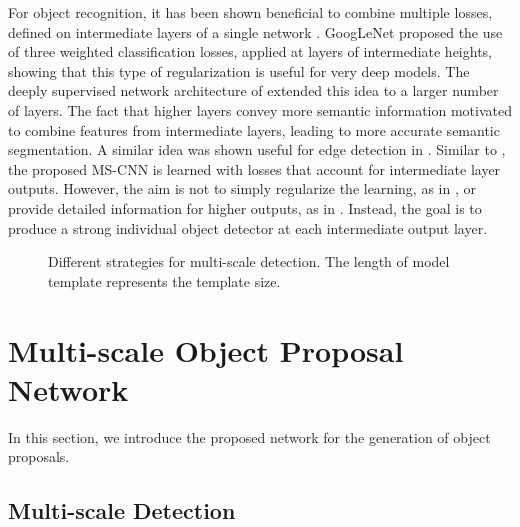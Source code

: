 \documentclass[runningheads]{llncs}
\begin{document}
For object recognition, it has been shown beneficial to
combine multiple losses, defined on intermediate layers of a single
network \cite{DBLP:conf/cvpr/SzegedyLJSRAEVR15,DBLP:conf/aistats/LeeXGZT15,DBLP:conf/cvpr/LongSD15,DBLP:conf/iccv/XieT15}.
GoogLeNet \cite{DBLP:conf/cvpr/SzegedyLJSRAEVR15} proposed the use of three
weighted classification losses, applied at layers of intermediate heights,
showing that this type of regularization is useful for very deep models.
The deeply supervised network architecture of
\cite{DBLP:conf/aistats/LeeXGZT15} extended this idea to a larger number of
layers. The fact that higher layers convey more semantic information
motivated \cite{DBLP:conf/cvpr/LongSD15} to combine features from
intermediate layers, leading to more accurate semantic segmentation.
A similar idea was shown useful for edge detection
in \cite{DBLP:conf/iccv/XieT15}. Similar to
\cite{DBLP:conf/cvpr/SzegedyLJSRAEVR15,DBLP:conf/aistats/LeeXGZT15,DBLP:conf/cvpr/LongSD15,DBLP:conf/iccv/XieT15},
the proposed MS-CNN is learned with losses that account for
intermediate layer outputs. However, the aim is not to simply regularize
the learning, as in \cite{DBLP:conf/cvpr/SzegedyLJSRAEVR15,DBLP:conf/aistats/LeeXGZT15}, or provide detailed information for higher
outputs, as in \cite{DBLP:conf/cvpr/LongSD15,DBLP:conf/iccv/XieT15}.
Instead, the goal is to produce a strong individual object detector
at each intermediate output layer.


\begin{figure}[!t]
\centering
\centerline{}
\caption{Different strategies for multi-scale detection. The length of model template represents the template size.}
\label{fig:multi-scale}
\end{figure}

\section{Multi-scale Object Proposal Network}
\label{sec:proposal network}

In this section, we introduce the proposed network for the
generation of object proposals.

\subsection{Multi-scale Detection}
\end{document}
